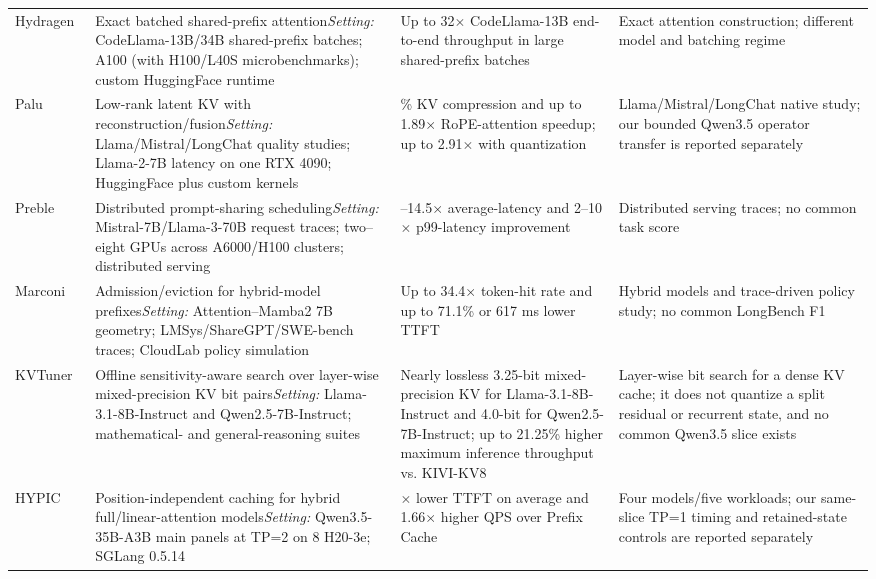 \begin{table}[H]
\begin{tabular}{@{}>{\raggedright\arraybackslash}p{}>{\raggedright\arraybackslash}p{}>{\raggedright\arraybackslash}p{}>{\raggedright\arraybackslash}p{}@{}}
Hydragen~\citep{juravsky2024hydragen} & Exact batched shared-prefix attention\newline \textit{Setting:} CodeLlama-13B/34B shared-prefix batches; A100 (with H100/L40S microbenchmarks); custom HuggingFace runtime & Up to 32$\times$ CodeLlama-13B end-to-end throughput in large shared-prefix batches & Exact attention construction; different model and batching regime \\
Palu~\citep{chang2025palu} & Low-rank latent KV with reconstruction/fusion\newline \textit{Setting:} Llama/Mistral/LongChat quality studies; Llama-2-7B latency on one RTX 4090; HuggingFace plus custom kernels & 50\% KV compression and up to 1.89$\times$ RoPE-attention speedup; up to 2.91$\times$ with quantization & Llama/Mistral/LongChat native study; our bounded Qwen3.5 operator transfer is reported separately \\
Preble~\citep{srivatsa2025preble} & Distributed prompt-sharing scheduling\newline \textit{Setting:} Mistral-7B/Llama-3-70B request traces; two--eight GPUs across A6000/H100 clusters; distributed serving & 1.5--14.5$\times$ average-latency and 2--10$\times$ p99-latency improvement & Distributed serving traces; no common task score \\
Marconi~\citep{pan2025marconi} & Admission/eviction for hybrid-model prefixes\newline \textit{Setting:} Attention--Mamba2 7B geometry; LMSys/ShareGPT/SWE-bench traces; CloudLab policy simulation & Up to 34.4$\times$ token-hit rate and up to 71.1\% or 617 ms lower TTFT & Hybrid models and trace-driven policy study; no common LongBench F1 \\
KVTuner~\citep{li2025kvtuner} & Offline sensitivity-aware search over layer-wise mixed-precision KV bit pairs\newline \textit{Setting:} Llama-3.1-8B-Instruct and Qwen2.5-7B-Instruct; mathematical- and general-reasoning suites & Nearly lossless 3.25-bit mixed-precision KV for Llama-3.1-8B-Instruct and 4.0-bit for Qwen2.5-7B-Instruct; up to 21.25\% higher maximum inference throughput vs. KIVI-KV8 & Layer-wise bit search for a dense KV cache; it does not quantize a split residual or recurrent state, and no common Qwen3.5 slice exists \\
HYPIC~\citep{liu2026hypic} & Position-independent caching for hybrid full/linear-attention models\newline \textit{Setting:} Qwen3.5-35B-A3B main panels at TP=2 on 8 H20-3e; SGLang 0.5.14 & 3.25$\times$ lower TTFT on average and 1.66$\times$ higher QPS over Prefix Cache & Four models/five workloads; our same-slice TP=1 timing and retained-state controls are reported separately \\
\bottomrule
\end{tabular}
\end{table}
